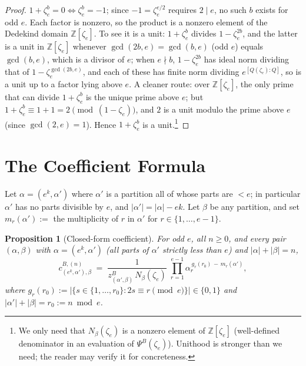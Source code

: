 \documentclass[11pt]{article}
\newtheorem{proposition}[theorem]{Proposition}
\theoremstyle{remark}
\newcommand{\zetae}{\zeta_e}
\newcommand{\ZZ}{\mathbb{Z}}
\newcommand{\PsiB}{\Psi^{B}}
\newcommand{\zB}{z^{B}}
\begin{document}
\begin{proof}
$1 + \zetae^b = 0 \iff \zetae^b = -1$; since $-1 = \zetae^{e/2}$ requires $2 \mid e$, no such $b$ exists for odd $e$. Each factor is nonzero, so the product is a nonzero element of the Dedekind domain $\ZZ[\zetae]$. To see it is a unit: $1 + \zetae^b$ divides $1 - \zetae^{2b}$, and the latter is a unit in $\ZZ[\zetae]$ whenever $\gcd(2b, e) = \gcd(b, e)$ (odd $e$) equals $\gcd(b, e)$, which is a divisor of $e$; when $e \nmid b$, $1 - \zetae^{2b}$ has ideal norm dividing that of $1 - \zetae^{\gcd(2b, e)}$, and each of these has finite norm dividing $e^{[Q(\zetae):Q]}$, so is a unit up to a factor lying above $e$. A cleaner route: over $\ZZ[\zetae]$, the only prime that can divide $1 + \zetae^b$ is the unique prime above $e$; but $1 + \zetae^b \equiv 1 + 1 = 2 \pmod{(1 - \zetae)}$, and $2$ is a unit modulo the prime above $e$ (since $\gcd(2, e) = 1$). Hence $1 + \zetae^b$ is a unit.\footnote{We only need that $N_\beta(\zetae)$ is a nonzero element of $\ZZ[\zetae]$ (well-defined denominator in an evaluation of $\PsiB(\zetae)$). Unithood is stronger than we need; the reader may verify it for concreteness.}
\end{proof}

\section{The Coefficient Formula}

Let $\alpha = (e^{k}, \alpha')$ where $\alpha'$ is a partition all of whose parts are $< e$; in particular $\alpha'$ has no parts divisible by $e$, and $|\alpha'| = |\alpha| - ek$. Let $\beta$ be any partition, and set $m_r(\alpha') := $ the multiplicity of $r$ in $\alpha'$ for $r \in \{1, \ldots, e-1\}$.

\begin{proposition}[Closed-form coefficient]\label{prop:coeff}
For odd $e$, all $n \ge 0$, and every pair $(\alpha, \beta)$ with $\alpha = (e^{k}, \alpha')$ (all parts of $\alpha'$ strictly less than $e$) and $|\alpha| + |\beta| = n$,
\begin{equation}\label{eq:coeff-B}
  c^{B, (n)}_{(e^{k}, \alpha'), \beta}
  \;=\; \frac{1}{\zB_{(\alpha', \beta)}\, N_\beta(\zetae)}\;
  \prod_{r=1}^{e-1} \alpha_r^{\,g_r(r_0)\, -\, m_r(\alpha')},
\end{equation}
where $g_r(r_0) := |\{s \in \{1, \ldots, r_0\} : 2s \equiv r \pmod e\}| \in \{0, 1\}$ and $|\alpha'| + |\beta| = r_0 := n \bmod e$.
\end{proposition}
\end{document}
